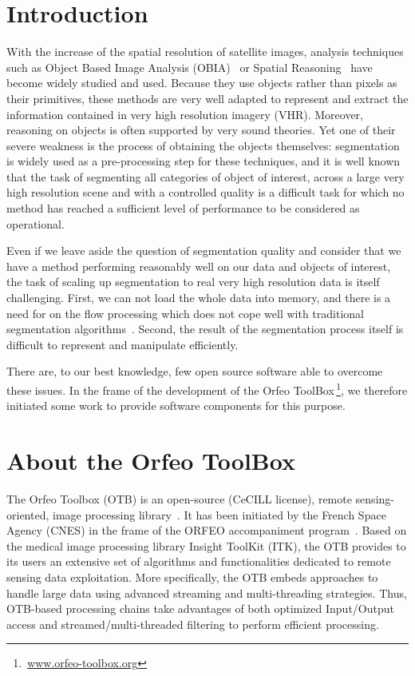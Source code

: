 \documentclass{josis}
\newcommand{\furl}[1]{$\,$\footnote{$\,$\url{#1}}}
\begin{document}
\section{Introduction}

With the increase of the spatial resolution of satellite images,
analysis techniques such as Object Based Image Analysis
(OBIA)~\cite{michel2010lazy} or Spatial
Reasoning~\cite{inglada2009qualitative,vanegas2009fuzzy,vanegas2010detection}
have become widely studied and used. Because they use objects rather
than pixels as their primitives, these methods are very well adapted
to represent and extract the information contained in very high
resolution imagery (VHR). Moreover, reasoning on objects is often
supported by very sound theories. Yet one of their severe weakness is
the process of obtaining the objects themselves: segmentation is
widely used as a pre-processing step for these techniques, and it is
well known that the task of segmenting all categories of object of
interest, across a large very high resolution scene and with a
controlled quality is a difficult task for which no method has reached
a sufficient level of performance to be considered as operational.

Even if we leave aside the question of segmentation quality and
consider that we have a method performing reasonably well on our data
and objects of interest, the task of scaling up segmentation to real
very high resolution data is itself challenging. First, we can not
load the whole data into memory, and there is a need for on the flow
processing which does not cope well with traditional segmentation
algorithms~\cite{shi2000normalized}. Second, the result of the
segmentation process itself is difficult to represent and manipulate
efficiently.

There are, to our best knowledge, few open source software able to
overcome these issues. In the frame of the development of the Orfeo
ToolBox\furl{www.orfeo-toolbox.org}, we therefore initiated
some work to provide software components for this purpose.

\section{About the Orfeo ToolBox}

The Orfeo Toolbox (OTB) is an open-source (CeCILL license), remote
sensing-oriented, image processing library~\cite{inglada2009orfeo}. It
has been initiated by the French Space Agency (CNES) in the frame of
the ORFEO accompaniment program~\cite{tinel2012orfeo}. Based on the
medical image processing library Insight ToolKit (ITK), the OTB
provides to its users an extensive set of algorithms and
functionalities dedicated to remote sensing data exploitation. More
specifically, the OTB embeds approaches to handle large data using
advanced streaming and multi-threading strategies. Thus, OTB-based
processing chains take advantages of both optimized Input/Output
access and streamed/multi-threaded filtering to perform efficient
processing.
\end{document}
